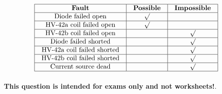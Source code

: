 

$$\vbox{\offinterlineskip
\halign{\strut
\vrule \quad\hfil # \ \hfil & 
\vrule \quad\hfil # \ \hfil & 
\vrule \quad\hfil # \ \hfil \vrule \cr
\noalign{\hrule}
%
{\bf Fault} & {\bf Possible} & {\bf Impossible} \cr
%
\noalign{\hrule}
%
Diode failed open & $\surd$ &  \cr
%
\noalign{\hrule}
%
HV-42a coil failed open & $\surd$ &  \cr
%
\noalign{\hrule}
%
HV-42b coil failed open &  & $\surd$ \cr
%
\noalign{\hrule}
%
Diode failed shorted &  & $\surd$ \cr
%
\noalign{\hrule}
%
HV-42a coil failed shorted &  & $\surd$ \cr
%
\noalign{\hrule}
%
HV-42b coil failed shorted &  & $\surd$ \cr
%
\noalign{\hrule}
%
Current source dead &  & $\surd$ \cr
%
\noalign{\hrule}
} %
}$$ %







{\bf This question is intended for exams only and not worksheets!}.



